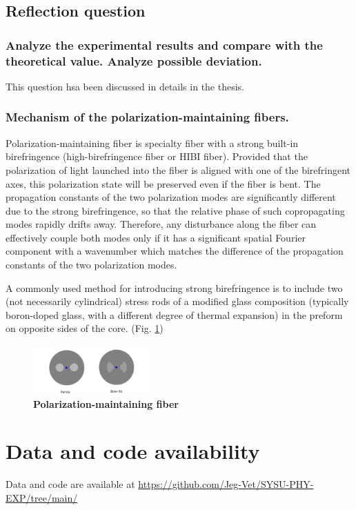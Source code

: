 \documentclass[12pt,a4paper,UTF8]{article}
\begin{document}
    \subsection{Reflection question}
        \subsubsection{Analyze the experimental results and compare with the theoretical value. Analyze possible deviation.}
        This question hsa been discussed in details in the thesis.
        \subsubsection{Mechanism of the polarization-maintaining fibers.}
        Polarization-maintaining fiber is specialty fiber with a strong built-in birefringence (high-birefringence fiber or HIBI fiber). 
        Provided that the polarization of light launched into the fiber is aligned with one of the birefringent axes, this polarization state will be preserved even if the fiber is bent. 
        The propagation constants of the two polarization modes are significantly different due to the strong birefringence, 
        so that the relative phase of such copropagating modes rapidly drifts away. 
        Therefore, any disturbance along the fiber can effectively couple both modes only if it has a significant spatial Fourier component with a wavenumber which matches the difference of the propagation constants of the two polarization modes.
        
        A commonly used method for introducing strong birefringence is to include two (not necessarily cylindrical) stress rods of a modified glass composition (typically boron-doped glass, with a different degree of thermal expansion) in the preform on opposite sides of the core.
        (Fig. \ref{fig.4.1})
        
        \begin{figure}[htbp]
            \centering
            \includegraphics[width=0.4\textwidth]{attachments/figs.4.1.png}
            \caption{\textbf{Polarization-maintaining fiber}}
            \label{fig.4.1}
        \end{figure}


\section{Data and code availability}
Data and code are available at \url{https://github.com/Jeg-Vet/SYSU-PHY-EXP/tree/main/}

\printbibliography[title=Reference] 
\end{document}
